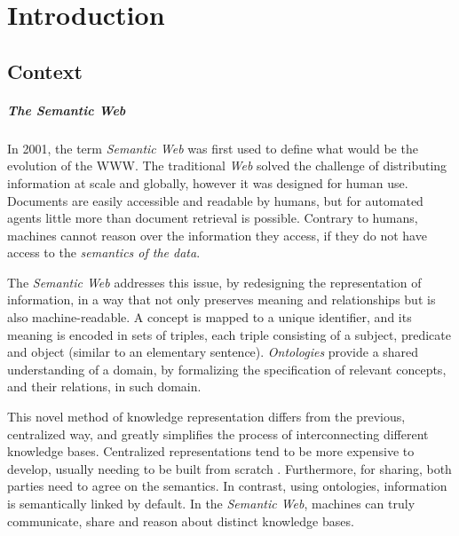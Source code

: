 

\chapter{Introduction}
\label{cha:introduction}

\section{Context}
\label{ch1:sec:context}

\paragraph{The Semantic Web} In 2001, the term \emph{Semantic Web} \autocite{Berners-Lee2001-ux} was first used to define what would be the evolution of the \gls{WWW}. The traditional \emph{Web} solved the challenge of distributing information at scale and globally, however it was designed for human use. Documents are easily accessible and readable by humans, but for automated agents little more than document retrieval is possible. Contrary to humans, machines cannot reason over the information they access, if they do not have access to the \emph{semantics of the data}.

The \emph{Semantic Web} addresses this issue, by redesigning the representation of information, in a way that not only preserves meaning and relationships but is also machine-readable.
A concept is mapped to a unique identifier, and its meaning is encoded in sets of triples, each triple consisting of a subject, predicate and object (similar to an elementary sentence). \emph{Ontologies} provide a shared understanding of a domain, by formalizing the specification of relevant concepts, and their relations, in such domain.

This novel method of knowledge representation differs from the previous, centralized way, and greatly simplifies the process of interconnecting different knowledge bases. Centralized representations tend to be more expensive to develop, usually needing to be built from scratch \autocite{Neches1991-lx}. Furthermore, for sharing, both parties need to agree on the semantics. In contrast, using ontologies, information is semantically linked by default. In the \emph{Semantic Web}, machines can truly communicate, share and reason about distinct knowledge bases.

